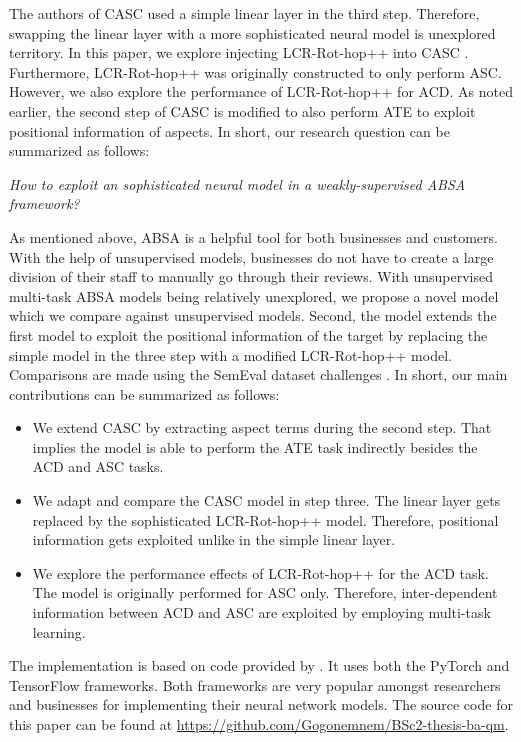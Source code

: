 \documentclass[american, oneside]{ecsgdp}
\begin{document}
The authors of CASC used a simple linear layer in the third step. Therefore, swapping the linear layer with a more sophisticated neural model is unexplored territory. In this paper, we explore injecting LCR-Rot-hop++ \parencite{Trusca2020HAABSA++} into CASC \parencite{Kumar2021CASC}. Furthermore, LCR-Rot-hop++ was originally constructed to only perform ASC. However, we also explore the performance of LCR-Rot-hop++ for ACD. As noted earlier, the second step of CASC is modified to also perform ATE to exploit positional information of aspects. In short, our research question can be summarized as follows:

\begin{center}
    \textit{How to exploit an sophisticated neural model in a weakly-supervised ABSA framework?}
\end{center}

As mentioned above, ABSA is a helpful tool for both businesses and customers. With the help of unsupervised models, businesses do not have to create a large division of their staff to manually go through their reviews. With unsupervised multi-task ABSA models being relatively unexplored, we propose a novel model which we compare against unsupervised models. Second, the model extends the first model to exploit the positional information of the target by replacing the simple model in the three step with a modified LCR-Rot-hop++ model. Comparisons are made using the SemEval dataset challenges \parencite{Pontiki2015SemEval, Pontiki2016SemEval}. In short, our main contributions can be summarized as follows:

\begin{itemize}
    \item We extend CASC by extracting aspect terms during the second step. That implies the model is able to perform the ATE task indirectly besides the ACD and ASC tasks.
    \item We adapt and compare the CASC model in step three. The linear layer gets replaced by the sophisticated LCR-Rot-hop++ model. Therefore, positional information gets exploited unlike in the simple linear layer.
    \item We explore the performance effects of LCR-Rot-hop++ for the ACD task. The model is originally performed for ASC only. Therefore, inter-dependent information between ACD and ASC are exploited by employing multi-task learning.
\end{itemize}

The implementation is based on code provided by \textcite{Kumar2021CASC}. It uses both the PyTorch and TensorFlow frameworks. Both frameworks are very popular amongst researchers and businesses for implementing their neural network models. The source code for this paper can be found at \url{https://github.com/Gogonemnem/BSc2-thesis-ba-qm}.
\end{document}
